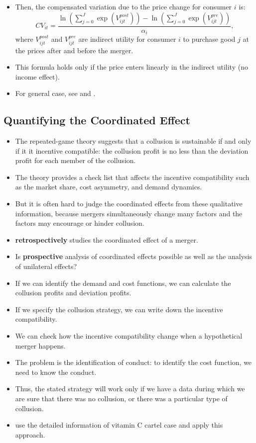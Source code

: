 \documentclass[
]{book}
\providecommand{\tightlist}{%
  \setlength{\itemsep}{0pt}\setlength{\parskip}{0pt}}
\begin{document}
\begin{itemize}
\tightlist
\item
  Then, the compensated variation due to the price change for consumer \(i\) is:
  \begin{equation}
  CV_{it} = \frac{\ln (\sum_{j = 0}^J \exp(V_{ijt}^{post}) ) - \ln (\sum_{j = 0}^J \exp(V_{ijt}^{pre})) }{\alpha_i},
  \end{equation}
  where \(V_{ijt}^{post}\) and \(V_{ijt}^{pre}\) are indirect utility for consumer \(i\) to purchase good \(j\) at the prices after and before the merger.
\item
  This formula holds only if the price enters linearly in the indirect utility (no income effect).
\item
  For general case, see \citet{Small1981} and \citet{Mcfadden1995}.
\end{itemize}

\hypertarget{quantifying-the-coordinated-effect}{%
\subsection{Quantifying the Coordinated Effect}\label{quantifying-the-coordinated-effect}}

\begin{itemize}
\tightlist
\item
  The repeated-game theory suggests that a collusion is sustainable if and only if it it incentive compatible: the collusion profit is no less than the deviation profit for each member of the collusion.
\item
  The theory provides a check list that affects the incentive compatibility such as the market share, cost asymmetry, and demand dynamics.
\item
  But it is often hard to judge the coordinated effects from these qualitative information, because mergers simultaneously change many factors and the factors may encourage or hinder collusion.
\item
  \citet{Miller2017} \textbf{retrospectively} studies the coordinated effect of a merger.
\item
  Is \textbf{prospective} analysis of coordinated effects possible as well as the analysis of unilateral effects?
\item
  If we can identify the demand and cost functions, we can calculate the collusion profits and deviation profits.
\item
  If we specify the collusion strategy, we can write down the incentive compatibility.
\item
  We can check how the incentive compatibility change when a hypothetical merger happens.
\item
  The problem is the identification of conduct: to identify the cost function, we need to know the conduct.
\item
  Thus, the stated strategy will work only if we have a data during which we are sure that there was no collusion, or there was a particular type of collusion.
\item
  \citet{Igami2018} use the detailed information of vitamin C cartel case and apply this approach.
\end{itemize}
\end{document}
